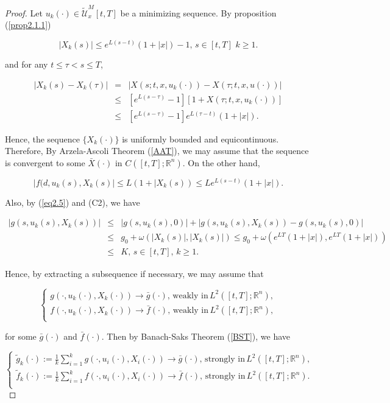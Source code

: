 \begin{proof}
Let $u_k(\cdot)\in\tilde{\mathcal{U}}^M_x[t,T]$ be a minimizing sequence. By proposition (\ref{prop2.1.1})

\begin{equation}\label{eq2.5}
|X_k(s)|\leq e^{L(s-t)}(1+|x|)-1,\,s\in [t,T]\,\,k\geq 1.
\end{equation}

and for any $t\leq \tau<s\leq T$,

\begin{eqnarray*}
|X_k(s)-X_k(\tau)|&=& |X(s;t,x,u_k(\cdot))-X(\tau;t,x,u(\cdot))|\\
&\leq& [e^{L(s-\tau)}-1][1+X(\tau;t,x,u_k(\cdot))]\\
&\leq& [e^{L(s-\tau)}-1]e^{L(\tau-t)}(1+|x|).
\end{eqnarray*}

Hence, the sequence $\{X_k(\cdot)\}$ is uniformly bounded and equicontinuous. Therefore, By Arzela-Ascoli Theorem (\ref{AAT}), we may assume that the sequence is convergent to some $\bar{X}(\cdot)$ in $C([t,T];\mathbb{R}^n)$. On the other hand,

$$|f(d,u_k(s),X_k(s)|\leq L(1+|X_k(s))\leq Le^{L(s-t)}(1+|x|).$$

Also, by (\ref{eq2.5}) and (C2), we have

\begin{eqnarray*}
|g(s,u_k(s),X_k(s))|&\leq& |g(s,u_k(s),0)|+|g(s,u_k(s),X_k(s))-g(s,u_k(s),0)|\\
&\leq& g_0+ \omega(|X_k(s)|,|X_k(s)|)\leq g_0+\omega(e^{LT}(1+|x|),e^{LT}(1+|x|))\\
&\leq& K,\,s\in [t,T],\,k\geq 1.
\end{eqnarray*}

Hence, by extracting a subsequence if necessary, we may assume that

$$\left\{ \begin{array}{l}
g(\cdot,u_k(\cdot),X_k(\cdot))\rightarrow \bar{g}(\cdot),\,\mbox{weakly in}\, L^2([t,T];\mathbb{R}^n), \\
f(\cdot,u_k(\cdot),X_k(\cdot))\rightarrow \bar{f}(\cdot),\,\mbox{weakly in}\, L^2([t,T];\mathbb{R}^n),\\
\end{array}
\right.$$

for some $\bar{g}(\cdot)$ and $\bar{f}(\cdot)$. Then by Banach-Saks Theorem (\ref{BST}), we have

\begin{equation}\label{eq2.6}
\left\{ \begin{array}{l}
\tilde{g}_k(\cdot):=\frac{1}{k}\sum_{i=1}^{k}g(\cdot,u_i(\cdot),X_i(\cdot))\rightarrow \bar{g}(\cdot),\,\mbox{strongly in}\, L^2([t,T];\mathbb{R}^n), \\
\tilde{f}_k(\cdot):=\frac{1}{k}\sum_{i=1}^{k}f(\cdot,u_i(\cdot),X_i(\cdot))\rightarrow \bar{f}(\cdot),\,\mbox{strongly in}\, L^2([t,T];\mathbb{R}^n).\\
\end{array}
\right.
\end{equation}


\end{proof}
